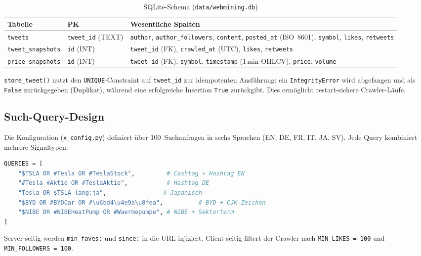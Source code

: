 \documentclass[11pt, a4paper]{article}
\begin{document}
\begin{table}[H]
\centering
\caption{SQLite-Schema (\texttt{data/webmining.db})}
\begin{tabular}{llp{7cm}}
\toprule
\textbf{Tabelle} & \textbf{PK} & \textbf{Wesentliche Spalten} \\
\midrule
\texttt{tweets} & \texttt{tweet\_id} (TEXT) &
  \texttt{author}, \texttt{author\_followers}, \texttt{content},
  \texttt{posted\_at} (ISO~8601), \texttt{symbol},
  \texttt{likes}, \texttt{retweets} \\
\addlinespace
\texttt{tweet\_snapshots} & \texttt{id} (INT) &
  \texttt{tweet\_id} (FK), \texttt{crawled\_at} (UTC),
  \texttt{likes}, \texttt{retweets} \\
\addlinespace
\texttt{price\_snapshots} & \texttt{id} (INT) &
  \texttt{tweet\_id} (FK), \texttt{symbol},
  \texttt{timestamp} (1\,min OHLCV),
  \texttt{price}, \texttt{volume} \\
\bottomrule
\end{tabular}
\end{table}

\noindent
\texttt{store\_tweet()} nutzt den \texttt{UNIQUE}-Constraint auf
\texttt{tweet\_id} zur idempotenten Ausführung: ein \texttt{IntegrityError}
wird abgefangen und als \texttt{False} zurückgegeben (Duplikat), während eine
erfolgreiche Insertion \texttt{True} zurückgibt. Dies ermöglicht
restart-sichere Crawler-Läufe.

\subsection{Such-Query-Design}

Die Konfiguration (\texttt{x\_config.py}) definiert über 100~Suchanfragen in
sechs Sprachen (EN, DE, FR, IT, JA, SV). Jede Query kombiniert mehrere
Signaltypen:

\begin{lstlisting}[language=Python, caption={Beispiel-Queries (x\_config.py)}]
QUERIES = [
    "$TSLA OR #Tesla OR #TeslaStock",         # Cashtag + Hashtag EN
    "#Tesla #Aktie OR #TeslaAktie",           # Hashtag DE
    "Tesla OR $TSLA lang:ja",                # Japanisch
    "$BYD OR #BYDCar OR #\u6bd4\u4e9a\u8fea",          # BYD + CJK-Zeichen
    "$NIBE OR #NIBEHeatPump OR #Waermepumpe", # NIBE + Sektorterm
]
\end{lstlisting}

Server-seitig werden \texttt{min\_faves:} und \texttt{since:} in die URL
injiziert. Client-seitig filtert der Crawler nach \texttt{MIN\_LIKES\,=\,100}
und \texttt{MIN\_FOLLOWERS\,=\,100}.
\end{document}
